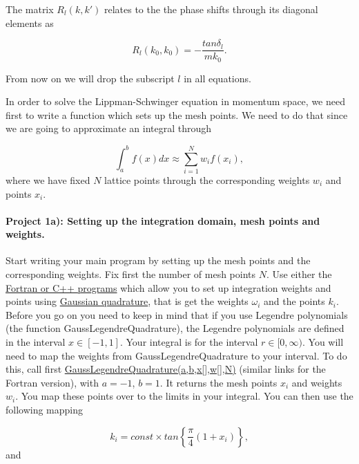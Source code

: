\documentclass[%
oneside,                 %
final,                   %
10pt]{article}
\begin{document}
The matrix $R_l(k,k')$ relates to the 
the  phase shifts through its diagonal elements as

\begin{equation}
     R_l(k_0,k_0)=-\frac{tan\delta_l}{mk_0}.
     \label{eq:shifts}
\end{equation}

From now on we will drop the subscript $l$ in all equations.

In order to solve the Lippman-Schwinger equation 
in momentum space, we need first to write 
a function which sets up the mesh points. 
We need to do that since we are going to approximate an integral
through

\begin{equation*}
   \int_a^bf(x)dx\approx\sum_{i=1}^Nw_if(x_i),
\end{equation*}
where we have fixed $N$ lattice points through the corresponding weights
$w_i$ and points $x_i$. 

\paragraph{Project 1a): Setting up the integration domain, mesh points and weights.}
Start writing your main program by setting up the mesh points
and the corresponding weights.
Fix first the number of mesh points $N$.
Use either the \href{{https://github.com/ManyBodyPhysics/NuclearForces/tree/master/doc/Programs/ScatteringTheory}}{Fortran or C++ programs}  which allow you to set up integration weights and points using \href{{http://compphysics.github.io/ComputationalPhysics/doc/pub/integrate/html/integrate-reveal.html}}{Gaussian quadrature}, that is get the
weights $\omega_i$ and the points $k_i$. Before you go on 
you need to keep in mind that if you use Legendre polynomials (the function GaussLegendreQuadrature),
the Legendre polynomials are defined in the  
interval $x\in [-1,1]$. Your integral is for the interval $r\in [0,\infty)$. 
You will need to map the weights  from GaussLegendreQuadrature to your interval.
To do this, call first \href{{https://github.com/ManyBodyPhysics/NuclearForces/blob/master/doc/Programs/ScatteringTheory/Cpp/IntegrationExample/integrationexample.cpp}}{GaussLegendreQuadrature(a,b,x[],w[],N)} (similar links for the Fortran version), 
with $a=-1$, $b=1$.
It returns the mesh points $x_i$ and weights $w_i$. 
You map these points over to the limits in your integral. You can then
use the following mapping

\begin{equation*}
          k_i=const\times tan\left\{\frac{\pi}{4}(1+x_i)\right\},
        \end{equation*}
and
\end{document}
